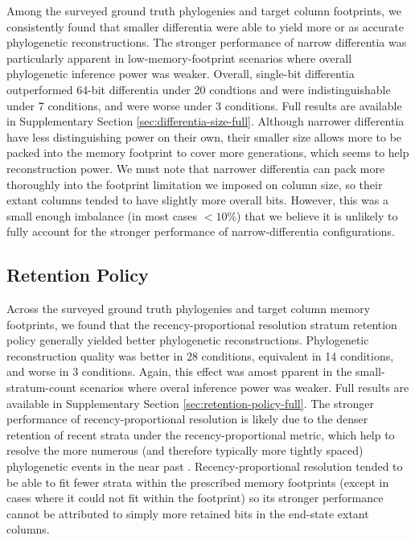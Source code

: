 Among the surveyed ground truth phylogenies and target column footprints, we consistently found that smaller differentia were able to yield more or as accurate phylogenetic reconstructions.
The stronger performance of narrow differentia was particularly apparent in low-memory-footprint scenarios where overall phylogenetic inference power was weaker.
Overall, single-bit differentia outperformed 64-bit differentia under 20 condtions and were indistinguishable under 7 conditions, and were worse under 3 conditions.
Full results are available in Supplementary Section \ref{sec:differentia-size-full}.
Although narrower differentia have less distinguishing power on their own, their smaller size allows more to be packed into the memory footprint to cover more generations, which seems to help reconstruction power.
We must note that narrower differentia can pack more thoroughly into the footprint limitation we imposed on column size, so their extant columns tended to have slightly more overall bits.
However, this was a small enough imbalance (in most cases $<10\%$) that we believe it is unlikely to fully account for the stronger performance of narrow-differentia configurations.

\subsection{Retention Policy}

Across the surveyed ground truth phylogenies and target column memory footprints, we found that the recency-proportional resolution stratum retention policy generally yielded better phylogenetic reconstructions.
Phylogenetic reconstruction quality was better in 28 conditions, equivalent in 14 conditions, and worse in 3 conditions.
Again, this effect was amost pparent in the small-stratum-count scenarios where overal inference power was weaker.
Full results are available in Supplementary Section \ref{sec:retention-policy-full}.
The stronger performance of recency-proportional resolution is likely due to the denser retention of recent strata under the recency-proportional metric, which help to resolve the more numerous (and therefore typically more tightly spaced) phylogenetic events in the near past \citep{zhaxybayeva2004cladogenesis}.
Recency-proportional resolution tended to be able to fit fewer strata within the prescribed memory footprints (except in cases where it could not fit within the footprint) so its stronger performance cannot be attributed to simply more retained bits in the end-state extant columns.
